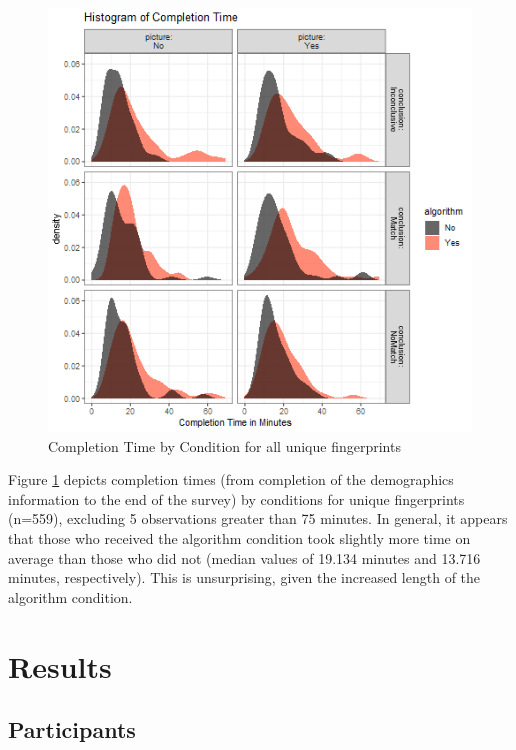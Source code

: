 \documentclass[print]{nuthesis}
\begin{document}
\begin{figure}

{\centering \includegraphics[width=\linewidth]{images/completiontime} 

}

\caption{Completion Time by Condition for all unique fingerprints}\label{fig:completiontime}
\end{figure}

Figure \ref{fig:completiontime} depicts completion times (from completion of the demographics information to the end of the survey) by conditions for unique fingerprints (n=559), excluding 5 observations greater than 75 minutes. In general, it appears that those who received the algorithm condition took slightly more time on average than those who did not (median values of 19.134 minutes and 13.716 minutes, respectively). This is unsurprising, given the increased length of the algorithm condition.

\hypertarget{results}{%
\section{Results}\label{results}}


\hypertarget{participants}{%
\subsection{Participants}\label{participants}}
\end{document}
